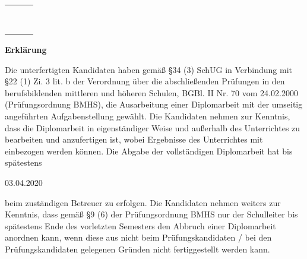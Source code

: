 \begin{tabular}{|l|l|l|}
\hline
 &  &  \\ \hline
 &  &  \\ \hline
 &  &  \\ \hline
 &  &  \\ \hline
 &  &  \\ \hline
 &  &  \\ \hline
 &  &  \\ \hline
 &  &  \\ \hline
 &  &  \\ \hline
\end{tabular}


\newpage
\thispagestyle{empty}
\mbox{}
\newpage


\newpage
\begin{huge}
\textbf{Erklärung}
\end{huge}
\bigskip

\begin{flushleft}
Die unterfertigten Kandidaten haben gemäß \S 34 (3) SchUG in Verbindung mit \S 22 (1) Zi. 3
lit. b der Verordnung über die abschließenden Prüfungen in den berufsbildenden mittleren und
höheren Schulen, BGBl. II Nr. 70 vom 24.02.2000 (Prüfungsordnung BMHS), die Ausarbeitung
einer Diplomarbeit mit der umseitig angeführten Aufgabenstellung gewählt.
Die Kandidaten nehmen zur Kenntnis, dass die Diplomarbeit in eigenständiger Weise und außerhalb
des Unterrichtes zu bearbeiten und anzufertigen ist, wobei Ergebnisse des Unterrichtes mit
einbezogen werden können.
Die Abgabe der vollständigen Diplomarbeit hat bis spätestens
\end{flushleft}

\bigskip
\begin{center}
\begin{large}
03.04.2020
\end{large}
\end{center}
\bigskip

\begin{flushleft}
beim zuständigen Betreuer zu erfolgen.
Die Kandidaten nehmen weiters zur Kenntnis, dass gemäß \S 9 (6) der Prüfungsordnung BMHS
nur der Schulleiter bis spätestens Ende des vorletzten Semesters den Abbruch einer Diplomarbeit
anordnen kann, wenn diese aus nicht beim Prüfungskandidaten / bei den Prüfungskandidaten
gelegenen Gründen nicht fertiggestellt werden kann.
\end{flushleft}

